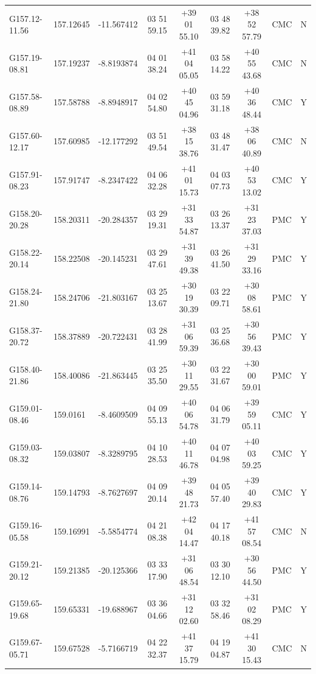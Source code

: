 \documentclass[UTF8, nocolorlinks]{pkuthss}
\begin{document}
\begin{footnotesize}
\begin{center}
\begin{supertabular}{lllcccclr}
		G157.12-11.56 & 157.12645 &  -11.567412   & 03 51 59.15 & +39 01 55.10 & 03 48 39.82 & +38 52 57.79   & CMC  & N\\
		G157.19-08.81 & 157.19237 &   -8.8193874  & 04 01 38.24 & +41 04 05.05 & 03 58 14.22 & +40 55 43.68   & CMC  & N\\
		G157.58-08.89 & 157.58788 &   -8.8948917  & 04 02 54.80 & +40 45 04.96 & 03 59 31.18 & +40 36 48.44   & CMC  & Y\\
		G157.60-12.17 & 157.60985 &  -12.177292   & 03 51 49.54 & +38 15 38.76 & 03 48 31.47 & +38 06 40.89   & CMC  & N\\
		G157.91-08.23 & 157.91747 &   -8.2347422  & 04 06 32.28 & +41 01 15.73 & 04 03 07.73 & +40 53 13.02   & CMC  & Y\\
		G158.20-20.28 & 158.20311 &  -20.284357   & 03 29 19.31 & +31 33 54.87 & 03 26 13.37 & +31 23 37.03   & PMC  & Y\\
		G158.22-20.14 & 158.22508 &  -20.145231   & 03 29 47.61 & +31 39 49.38 & 03 26 41.50 & +31 29 33.16   & PMC  & Y\\
		G158.24-21.80 & 158.24706 &  -21.803167   & 03 25 13.67 & +30 19 30.39 & 03 22 09.71 & +30 08 58.61   & PMC  & Y\\
		G158.37-20.72 & 158.37889 &  -20.722431   & 03 28 41.99 & +31 06 59.39 & 03 25 36.68 & +30 56 39.43   & PMC  & Y\\
		G158.40-21.86 & 158.40086 &  -21.863445   & 03 25 35.50 & +30 11 29.55 & 03 22 31.67 & +30 00 59.01   & PMC  & Y\\
		G159.01-08.46 & 159.0161  &   -8.4609509  & 04 09 55.13 & +40 06 54.78 & 04 06 31.79 & +39 59 05.11   & CMC  & Y\\
		G159.03-08.32 & 159.03807 &   -8.3289795  & 04 10 28.53 & +40 11 46.78 & 04 07 04.98 & +40 03 59.25   & CMC  & Y\\
		G159.14-08.76 & 159.14793 &   -8.7627697  & 04 09 20.14 & +39 48 21.73 & 04 05 57.40 & +39 40 29.83   & CMC  & Y\\
		G159.16-05.58 & 159.16991 &   -5.5854774  & 04 21 08.38 & +42 04 14.47 & 04 17 40.18 & +41 57 08.54   & CMC  & N\\
		G159.21-20.12 & 159.21385 &  -20.125366   & 03 33 17.90 & +31 06 48.54 & 03 30 12.10 & +30 56 44.50   & PMC  & Y\\
		G159.65-19.68 & 159.65331 &  -19.688967   & 03 36 04.66 & +31 12 02.60 & 03 32 58.46 & +31 02 08.29   & PMC  & Y\\
		G159.67-05.71 & 159.67528 &   -5.7166719  & 04 22 32.37 & +41 37 15.79 & 04 19 04.87 & +41 30 15.43   & CMC  & N\\

\end{supertabular}
\end{center}
\end{footnotesize}
\end{document}
